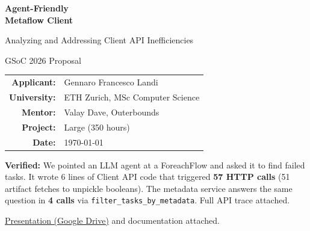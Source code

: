 \documentclass[11pt,a4paper]{article}
\begin{document}

\begin{titlepage}
\begin{center}
\vspace*{1.5cm}

{\Huge\bfseries\color{mfpurple} Agent-Friendly\\[0.3em] Metaflow Client}

\vspace{0.8em}

{\Large Analyzing and Addressing Client API Inefficiencies}

\vspace{1.5em}

{\large GSoC 2026 Proposal}

\vspace{2em}

\begin{tabular}{rl}
\textbf{Applicant:} & Gennaro Francesco Landi \\
\textbf{University:} & ETH Zurich, MSc Computer Science \\
\textbf{Mentor:} & Valay Dave, Outerbounds \\
\textbf{Project:} & Large (350 hours) \\
\textbf{Date:} & \today \\
\end{tabular}

\vspace{2em}

\colorbox{mfbg}{%
\begin{minipage}{0.85\textwidth}
\centering\vspace{0.6em}
\textbf{Verified:} We pointed an LLM agent at a ForeachFlow and asked it to find failed tasks. It wrote 6 lines of Client API code that triggered \textbf{57 HTTP calls} (51 artifact fetches to unpickle booleans). The metadata service answers the same question in \textbf{4 calls} via \texttt{filter\_tasks\_by\_metadata}. Full API trace attached.
\vspace{0.6em}
\end{minipage}%
}

\vfill
{\small\color{mfgray} \href{https://drive.google.com/file/d/1kOcsjZq4CIPGR2IsXiEggBKzrgb08ME4/view?usp=sharing}{Presentation (Google Drive)} and documentation attached.}
\end{center}
\end{titlepage}
\end{document}
